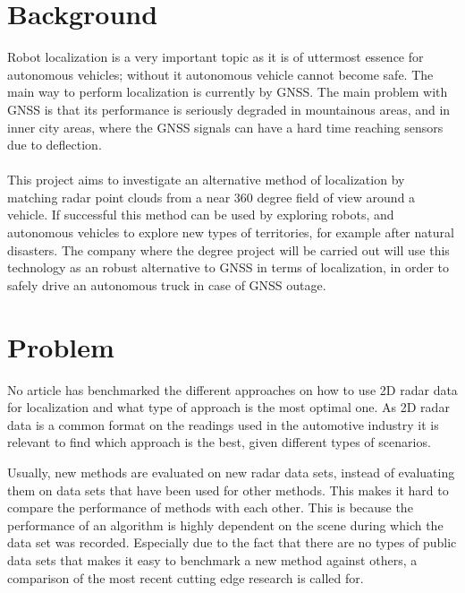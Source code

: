 \section{Background}
\label{sec:background}
Robot localization is a very important topic as it is of uttermost essence for autonomous vehicles; without it autonomous vehicle cannot become safe. The main way to perform localization is currently by GNSS. The main problem with GNSS is that its performance is seriously degraded in mountainous areas, and in inner city areas, where the GNSS signals can have a hard time reaching sensors due to deflection. 
\\\\
This project aims to investigate an alternative method of localization by matching radar point clouds from a near 360 degree field of view around a vehicle. If successful this method can be used by exploring robots, and autonomous vehicles to explore new types of territories, for example after natural disasters. The company where the degree project will be carried out will use this technology as an robust alternative to GNSS in terms of localization, in order to safely drive an autonomous truck in case of GNSS outage. %


% 


\section{Problem}
No article has benchmarked the different approaches on how to use 2D radar data for localization and what type of approach is the most optimal one. As 2D radar data is a common format on the readings used in the automotive industry it is relevant to find which approach is the best, given different types of scenarios.

Usually, new methods are evaluated on new radar data sets, instead of evaluating them on data sets that have been used for other methods. This makes it hard to compare the performance of methods with each other. This is because the performance of an algorithm is highly dependent on the scene during which the data set was recorded. Especially due to the fact that there are no types of public data sets that makes it easy to benchmark a new method against others, a comparison of the most recent cutting edge research is called for.

